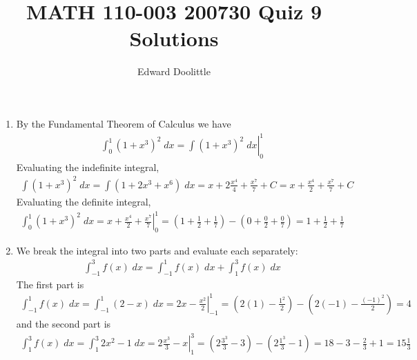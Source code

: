 \documentclass[12pt]{article}
\title{MATH 110-003 200730 Quiz 9 Solutions}
\author{Edward Doolittle}
\begin{document}
\maketitle

\begin{enumerate}
\item By the Fundamental Theorem of Calculus we have
  \begin{align*}
    \int_0^1 (1+x^3)^2 \; dx
    = \left. \int (1+x^3)^2 \; dx \right|_0^1
  \end{align*}
  Evaluating the indefinite integral,
  \begin{align*}
    \int (1+x^3)^2 \; dx
    = \int (1+2x^3+x^6) \; dx
    = x + 2\frac{x^4}{4} + \frac{x^7}{7} + C
    = x + \frac{x^4}{2} + \frac{x^7}{7} + C
  \end{align*}
  Evaluating the definite integral,
  \begin{align*}
    \int_0^1 (1+x^3)^2 \; dx
    = \left. x + \frac{x^4}{2} + \frac{x^7}{7} \right|_0^1
    = \left(1 + \frac{1}{2} + \frac{1}{7}\right) 
    - \left(0 + \frac{0}{2} + \frac{0}{7}\right)
    = 1 + \frac{1}{2} + \frac{1}{7}
  \end{align*}
\item We break the integral into two parts and evaluate each separately:
  \begin{align*}
    \int_{-1}^3 f(x) \; dx 
    = \int_{-1}^1 f(x) \; dx + \int_1^3 f(x) \; dx
  \end{align*}
  The first part is 
  \begin{align*}
    \int_{-1}^1 f(x) \; dx
    = \int_{-1}^1 (2-x) \; dx
    = \left. 2x-\frac{x^2}{2} \right|_{-1}^1
    = \left( 2(1)-\frac{1^2}{2}\right)
    - \left( 2(-1)-\frac{(-1)^2}{2}\right)
    = 4
  \end{align*}
  and the second part is
  \begin{align*}
    \int_1^3 f(x) \; dx
    = \int_1^3 2x^2-1 \; dx
    = \left. 2\frac{x^3}{3} - x \right|_1^3
    = \left( 2\frac{3^3}{3} - 3 \right)
    - \left( 2\frac{1^3}{3} - 1 \right)
    = 18 - 3 - \frac{2}{3} + 1
    = 15 \frac{1}{3}
  \end{align*}
\end{enumerate}
\end{document}
